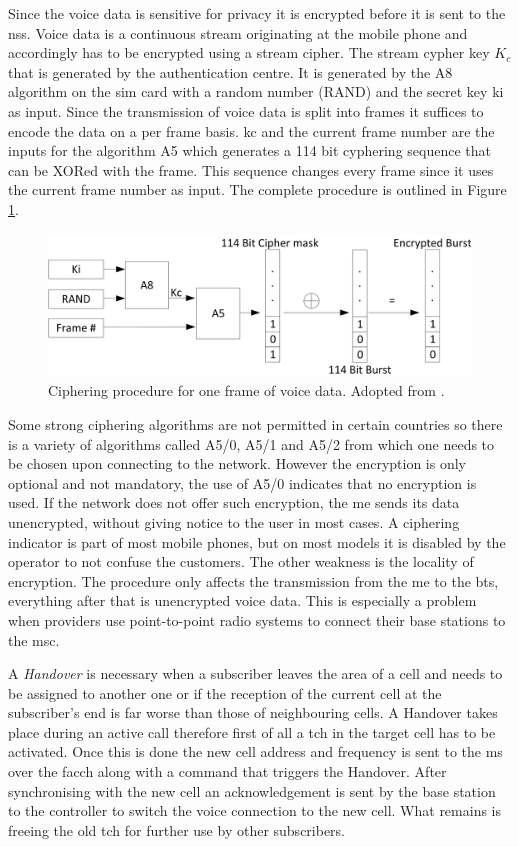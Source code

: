 Since the voice data is sensitive for privacy it is encrypted before it is sent to the \gls{nss}.
Voice data is a continuous stream originating at the mobile phone and accordingly has to be encrypted using a stream cipher.
The stream cypher key $K_c$ that is generated by the authentication centre.
It is generated by the A8 algorithm on the \gls{sim} card with a random number (RAND) and the secret key \gls{ki} as input.
Since the transmission of voice data is split into frames it suffices to encode the data on a per frame basis.
\gls{kc} and the current frame number are the inputs for the algorithm A5 which generates a 114 bit cyphering sequence that can be XORed with the frame.
This sequence changes every frame since it uses the current frame number as input.
The complete procedure is outlined in Figure \ref{fig:cypher}.
\begin{figure}
\centering
\includegraphics{../Images/Cipher}
\caption{Ciphering procedure for one frame of voice data. Adopted from \cite{kommsys2006}.}
\label{fig:cypher}
\end{figure}
Some strong ciphering algorithms are not permitted in certain countries so there is a variety of algorithms called A5/0, A5/1 and A5/2 from which one needs to be chosen upon connecting to the network.
However the encryption is only optional and not mandatory, the use of A5/0 indicates that no encryption is used.
If the network does not offer such encryption, the \gls{me} sends its data unencrypted, without giving notice to the user in most cases.
A ciphering indicator is part of most mobile phones, but on most models it is disabled by the operator to not confuse the customers.
The other weakness is the locality of encryption.
The procedure only affects the transmission from the \gls{me} to the \gls{bts}, everything after that is unencrypted voice data.
This is especially a problem when providers use point-to-point radio systems to connect their base stations to the \gls{msc}.

A \emph{Handover} is necessary when a subscriber leaves the area of a cell and needs to be assigned to another one or if the reception of the current cell at the subscriber's end is far worse than those of neighbouring cells.
A Handover takes place during an active call therefore first of all a \gls{tch} in the target cell has to be activated.
Once this is done the new cell address and frequency is sent to the \gls{ms} over the \gls{facch} along with a command that triggers the Handover.
After synchronising with the new cell an acknowledgement is sent by the base station to the controller to switch the voice connection to the new cell.
What remains is freeing the old \gls{tch} for further use by other subscribers.

